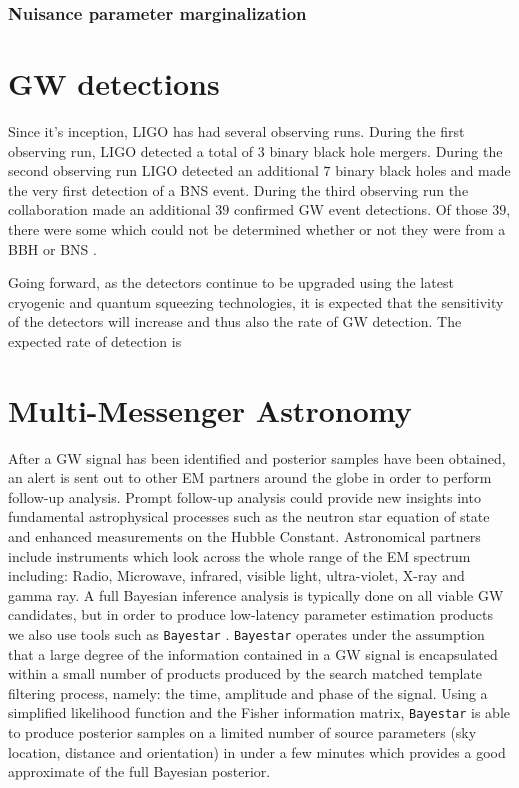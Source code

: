 %
%

\subsubsection{Nuisance parameter marginalization}

\section{GW detections}

%
%

Since it's inception, \ac{LIGO} has had several observing runs. 
During the first observing run, \ac{LIGO} detected a total of $3$ binary 
black hole mergers. During the second observing run \ac{LIGO} detected an 
additional $7$ binary black holes and made the very first detection of a 
\ac{BNS} event. During the third observing run the collaboration made an 
additional $39$ confirmed \ac{GW} event detections. Of those $39$, there were 
some which could not be determined whether or not they were from a \ac{BBH} 
or \ac{BNS} \cite{1811.12907, 2010.14527}. 

%
%

Going forward, as the detectors continue to be upgraded using 
the latest cryogenic and quantum squeezing technologies, it is expected 
that the sensitivity of the detectors will increase and thus also the 
rate of \ac{GW} detection. The expected rate of detection is 

\section{Multi-Messenger Astronomy}

After a \ac{GW} signal has been identified and posterior samples have 
been obtained, an alert is sent out to other \ac{EM} partners around the 
globe in order to perform follow-up analysis. Prompt follow-up analysis could 
provide new insights into fundamental astrophysical processes such as 
the neutron star equation of state and enhanced measurements on 
the Hubble Constant. Astronomical partners include instruments which look across 
the whole range of the \ac{EM} spectrum including: Radio, Microwave, 
infrared, visible light, ultra-violet, X-ray and gamma ray. A full Bayesian 
inference analysis is typically done on all viable \ac{GW} candidates, but 
in order to produce low-latency parameter estimation products we also 
use tools such as \texttt{Bayestar} \cite{2016PhRvD..93b4013S}. \texttt{Bayestar} operates under the 
assumption that a large degree of the information contained in a \ac{GW} 
signal is encapsulated within a small number of products produced by the 
search matched template filtering process, namely: the time, amplitude 
and phase of the signal. Using a simplified likelihood function and the 
Fisher information matrix, \texttt{Bayestar} is able to produce posterior 
samples on a limited number of source parameters (sky location, distance and orientation) 
in under a few minutes which provides a good approximate of the full 
Bayesian posterior.

